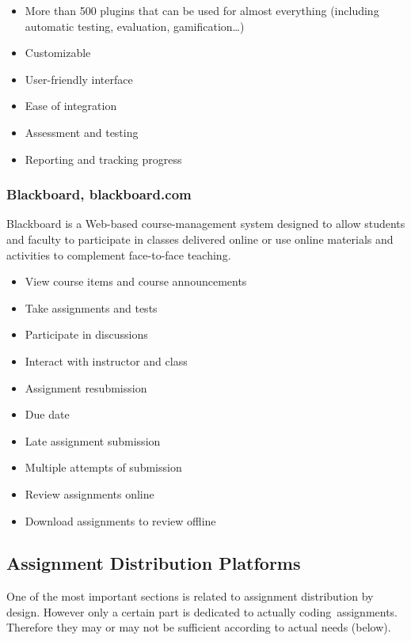 \begin{itemize}
\item
  {More than 500 plugins that can be used for almost everything (including automatic testing, evaluation, gamification\ldots{})}
\item
  {Customizable}
\item
  {User-friendly interface}
\item
  {Ease of integration}
\item
  {Assessment and testing}
\item
  {Reporting and tracking progress}
\end{itemize}

\subsubsection{Blackboard, blackboard.com}

{Blackboard is a Web-based course-management system designed to allow students and faculty to participate in classes delivered online or use online materials and activities to complement face-to-face teaching.}

\begin{itemize}
\item
  {View course items and course announcements}
\item
  {Take assignments and tests}
\item
  {Participate in discussions}
\item
  {Interact with instructor and class}
\item
  {Assignment resubmission}
\item
  {Due date}
\item
  {Late assignment submission}
\item
  {Multiple attempts of submission}
\item
  {Review assignments online}
\item
  {Download assignments to review offline}
\end{itemize}

\subsection{Assignment Distribution Platforms} \label{ssec:adp}

{One of the most important sections is related to assignment distribution by design. }{However only a certain part is dedicated to actually }{coding}{~assignments. Therefore they may or may not be sufficient according to actual needs (below).}

